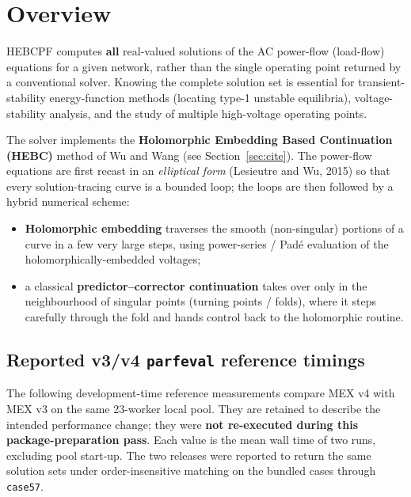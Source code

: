 \documentclass[11pt,a4paper]{article}
\newcommand{\code}[1]{\texttt{#1}}
\begin{document}
\section{Overview}

HEBCPF computes \textbf{all} real-valued solutions of the AC power-flow (load-flow)
equations for a given network, rather than the single operating point returned by a
conventional solver. Knowing the complete solution set is essential for
transient-stability energy-function methods (locating type-1 unstable equilibria),
voltage-stability analysis, and the study of multiple high-voltage operating points.

The solver implements the \textbf{Holomorphic Embedding Based Continuation (HEBC)}
method of Wu and Wang (see Section~\ref{sec:cite}). The power-flow equations are first
recast in an \emph{elliptical form} (Lesieutre and Wu, 2015) so that every
solution-tracing curve is a
bounded loop; the loops are then followed by a hybrid numerical scheme:

\begin{itemize}[leftmargin=1.4em]
  \item \textbf{Holomorphic embedding} traverses the smooth (non-singular) portions of
        a curve in a few very large steps, using power-series / Pad\'e evaluation of the
        holomorphically-embedded voltages;
  \item a classical \textbf{predictor--corrector continuation} takes over only in the
        neighbourhood of singular points (turning points / folds), where it steps
        carefully through the fold and hands control back to the holomorphic routine.
\end{itemize}

\subsection{Reported v3/v4 \code{parfeval} reference timings}
The following development-time reference measurements compare MEX v4 with MEX v3 on the
same 23-worker local pool. They are retained to describe the intended performance change;
they were \textbf{not re-executed during this package-preparation pass}. Each value is the
mean wall time of two runs, excluding pool start-up. The two releases were reported to
return the same solution sets under order-insensitive matching on the bundled cases through
\code{case57}.
\end{document}
